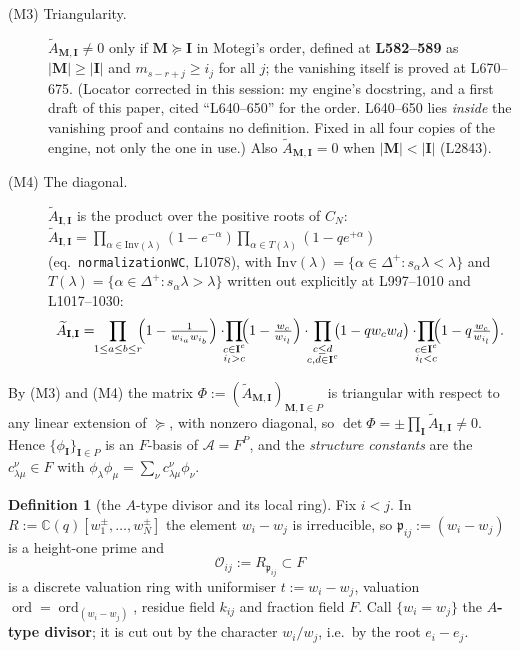 \documentclass[11pt]{article}
\theoremstyle{plain}
\theoremstyle{definition}
\newtheorem{defn}[thm]{Definition}
\theoremstyle{remark}
\theoremstyle{plain}
\newcommand{\bI}{\mathbf{I}}
\newcommand{\bM}{\mathbf{M}}
\newcommand{\At}{\widetilde{A}}
\newcommand{\ord}{\operatorname{ord}}
\begin{document}
\begin{description}
\item[(M3) Triangularity.]  $\At_{\bM,\bI}\neq0$ only if $\bM\succeq\bI$ in
  Motegi's order, defined at \textbf{L582--589} as $|\bM|\ge|\bI|$ and
  $m_{s-r+j}\ge i_j$ for all $j$; the vanishing itself is proved at L670--675.
  (Locator corrected in this session: my engine's docstring, and a first draft of
  this paper, cited ``L640--650'' for the order.  L640--650 lies \emph{inside}
  the vanishing proof and contains no definition.  Fixed in all four copies of
  the engine, not only the one in use.)  Also $\At_{\bM,\bI}=0$ when
  $|\bM|<|\bI|$ (L2843).
\item[(M4) The diagonal.]  $\At_{\bI,\bI}$ is the product over the positive
  roots of $C_N$: $\At_{\bI,\bI}
  =\prod_{\alpha\in\mathrm{Inv}(\lambda)}(1-e^{-\alpha})
   \prod_{\alpha\in T(\lambda)}(1-qe^{+\alpha})$ (eq.\
  \texttt{normalizationWC}, L1078), with $\mathrm{Inv}(\lambda)=\{\alpha\in
  \Delta^+:s_\alpha\lambda<\lambda\}$ and $T(\lambda)=\{\alpha\in\Delta^+:
  s_\alpha\lambda>\lambda\}$ written out explicitly at L997--1010 and
  L1017--1030:
  \begin{equation}\label{eq:diag}
  \At_{\bI,\bI}
  =\!\!\prod_{1\le a\le b\le r}\!\!\Bigl(1-\tfrac{1}{w_{i_a}w_{i_b}}\Bigr)
   \cdot\!\!\prod_{\substack{c\in\bI^{c}\\ i_l>c}}\!\!\Bigl(1-\tfrac{w_c}{w_{i_l}}\Bigr)
   \cdot\!\!\prod_{\substack{c\le d\\ c,d\in\bI^{c}}}\!\!\bigl(1-qw_cw_d\bigr)
   \cdot\!\!\prod_{\substack{c\in\bI^{c}\\ i_l<c}}\!\!\Bigl(1-q\tfrac{w_c}{w_{i_l}}\Bigr).
  \end{equation}
\end{description}

By (M3) and (M4) the matrix $\Phi:=(\At_{\bM,\bI})_{\bM,\bI\in P}$ is triangular
with respect to any linear extension of $\succeq$, with nonzero diagonal, so
$\det\Phi=\pm\prod_\bI\At_{\bI,\bI}\neq0$.  Hence $\{\phi_\bI\}_{\bI\in P}$ is an
$F$-basis of $\mathcal{A}=F^P$, and the \emph{structure constants} are the
$c^\nu_{\lambda\mu}\in F$ with
$\phi_\lambda\phi_\mu=\sum_\nu c^\nu_{\lambda\mu}\phi_\nu$.

\begin{defn}[the $A$-type divisor and its local ring]
Fix $i<j$.  In $R:=\mathbb{C}(q)[w_1^{\pm},\dots,w_N^{\pm}]$ the element
$w_i-w_j$ is irreducible, so $\mathfrak{p}_{ij}:=(w_i-w_j)$ is a height-one prime
and
\[
  \mathcal{O}_{ij}:=R_{\mathfrak{p}_{ij}}\subset F
\]
is a discrete valuation ring with uniformiser $t:=w_i-w_j$, valuation
$\ord=\ord_{(w_i-w_j)}$, residue field $k_{ij}$ and fraction field $F$.  Call
$\{w_i=w_j\}$ the \textbf{$A$-type divisor}; it is cut out by the character
$w_i/w_j$, i.e.\ by the root $e_i-e_j$.
\end{defn}
\end{document}
